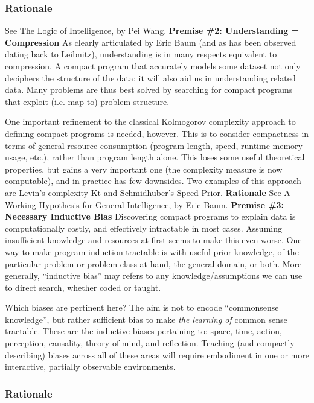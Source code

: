 \documentclass[twoside,11pt]{article}
\begin{document}
\subsubsection{Rationale}

See The Logic of Intelligence, by Pei Wang. \textbf{Premise \#2: Understanding
  = Compression} As clearly articulated by Eric Baum (and as has been observed
dating back to Leibnitz), understanding is in many respects equivalent to
compression. A compact program that accurately models some dataset not only
deciphers the structure of the data; it will also aid us in understanding
related data. Many problems are thus best solved by searching for compact
programs that exploit (i.e. map to) problem structure.

One important refinement to the classical Kolmogorov complexity approach to
defining compact programs is needed, however. This is to consider compactness
in terms of general resource consumption (program length, speed, runtime memory
usage, etc.), rather than program length alone. This loses some useful
theoretical properties, but gains a very important one (the complexity measure
is now computable), and in practice has few downsides. Two examples of this
approach are Levin's complexity Kt and Schmidhuber's Speed
Prior. \textbf{Rationale} See A Working Hypothesis for General Intelligence, by
Eric Baum. \textbf{Premise \#3: Necessary Inductive Bias} Discovering compact
programs to explain data is computationally costly, and effectively intractable
in most cases. Assuming insufficient knowledge and resources at first seems to
make this even worse. One way to make program induction tractable is with
useful prior knowledge, of the particular problem or problem class at hand, the
general domain, or both. More generally, ``inductive bias'' may refers to any
knowledge/assumptions we can use to direct search, whether coded or taught.

Which biases are pertinent here? The aim is not to encode ``commonsense
knowledge'', but rather sufficient bias to make \emph{the learning of} common
sense tractable. These are the inductive biases pertaining to: space, time,
action, perception, causality, theory-of-mind, and reflection. Teaching (and
compactly describing) biases across all of these areas will require embodiment
in one or more interactive, partially observable
environments. 

\subsubsection{Rationale}
\end{document}
